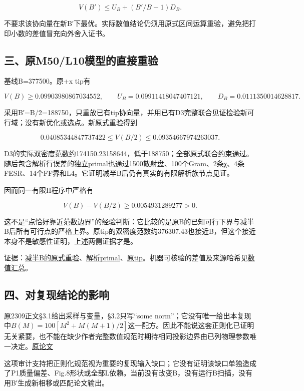 \documentclass[
  10pt,
  a4paper,
]{article}
\begin{document}
\[
V(B')\le U_B+(B'/B-1)D_B.
\]

不要求该协向量在新B′下最优。实际数值结论仍须用原式区间运算重验，避免把打印小数的差值冒充向外舍入证书。

\subsection{三、原M50/L10模型的直接重验}\label{ux4e09ux539fm50l10ux6a21ux578bux7684ux76f4ux63a5ux91cdux9a8c}

基线B=377500。原+x tip有

\[
V(B)\ge0.09903980867034552,
\qquad U_B=0.09911418047407121,
\qquad D_B=0.0111350014628817.
\]

采用B′=B/2=188750，只重放已有tip协向量，并用已有D3完整联合见证检验新可行域；没有新优化或选点。新原式重验得到

\[
0.04085344847737422\le V(B/2)\le0.09354667974263037.
\]

D3的实际双密度范数约174150.23158644，低于188750；全部原式联合约束通过。随后包含解析行误差的独立primal也通过1500散射盘、100个Gram、2条χ、4条FESR、14个FF界和L4。它证明减半B后仍有真实的有限解析族节点见证。

因而同一有限H程序中严格有

\[
V(B)-V(B/2)\ge0.0054931289277>0.
\]

这不是``点恰好靠近范数边界''的经验判断：它比较的是原B的已知可行下界与减半B后所有可行点的严格上界。原tip的双密度范数约376307.43也接近B，但这个接近本身不是敏感性证明，上述两侧证据才是。

证据：\href{../regularizer_half_bound_replay/report.json}{减半B的原式重验}、\href{../regularizer_half_analytic/source_audit.json}{解析primal}、\href{../../sequential_reproduction_20260910/E1_tip_center/report.json}{原tip}。机器可核验的差值及来源哈希见\href{../REGULARIZATION_VALUE_PROOF.json}{数值汇总}。

\subsection{四、对复现结论的影响}\label{ux56dbux5bf9ux590dux73b0ux7ed3ux8bbaux7684ux5f71ux54cd}

原2309正文§3.1给出采样与变量，§3.2只写``some
norm''；它没有唯一给出本复现中\(B(M)=100[M^2+M(M+1)/2]\)这一配方。因此不能说这套正则化已证明无关紧要，也不能在缺少作者完整数值规范时期待相同投影边界由已列物理参数唯一决定。\href{https://arxiv.org/abs/2309.12402v3}{原论文}

这项审计支持把正则化规范视为重要的复现输入缺口；它没有证明该缺口单独造成了P1质量偏差、Fig.8形状或全部L依赖。当前没有改变B，没有运行B扫描，没有用B′生成新相移或匹配论文输出。
\end{document}
